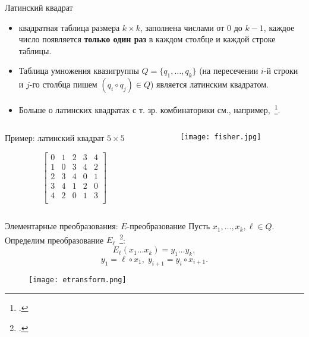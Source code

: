 \begin{frame}{Латинский квадрат}
    \begin{itemize}
        \item квадратная таблица размера $k \times k$, заполнена числами от $0$ до $k-1$, каждое число появляется \textbf{только один раз} в каждом столбце и каждой строке таблицы.
        \pause
        \item Таблица умножения квазигруппы $Q = \{q_1, \ldots, q_k \}$ (на пересечении $i$-й строки и $j$-го столбца пишем $(q_i \circ q_j) \in Q$) является латинским квадратом.
        \pause 
        \item Больше о латинских квадратах с т. зр. комбинаторики см., например,~\footcite{keedwell}.
    \end{itemize}

    \pause
    \begin{columns}[T] %
        \begin{column}{.48\textwidth}
            \begin{block}{Пример: латинский квадрат $5 \times 5$}
                \begin{center}
                  \[
                    \begin{bmatrix}
                        0 & 1 & 2 & 3 & 4 \\
                        1 & 0 & 3 & 4 & 2 \\
                        2 & 3 & 4 & 0 & 1 \\
                        3 & 4 & 1 & 2 & 0 \\
                        4 & 2 & 0 & 1 & 3 \\
                    \end{bmatrix}
                  \]
                \end{center}
            \end{block}
        \end{column}%
        \hfill%
        \begin{column}{.48\textwidth}
            \begin{figure}[h]
                \centering 
                \texttt{[image: fisher.jpg]}
            \end{figure}
        \end{column}%
    \end{columns}
    
\end{frame}


\begin{frame}{Элементарные преобразования: $E$-преобразование}
    Пусть $x_1, \ldots, x_k, \ell \in Q$.
    Определим преобразование $E_{\ell}$~\footcite{markovski2017quasigroup}:
    \pause 
    \[
        E_{\ell}(x_1 \ldots x_k) = y_1 \ldots y_k,
    \]
    \pause
    \[
        y_1 = \ell \circ x_1, \; y_{i+1} = y_i \circ x_{i+1}.
    \]
    \begin{figure}[h]
        \centering 
        \texttt{[image: etransform.png]}
    \end{figure}
\end{frame}


